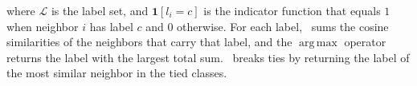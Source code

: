 where $\mathcal{L}$ is the label set, and $\mathbf{1}[l_i = c]$ is the indicator function that equals $1$ when neighbor $i$ has label $c$ and $0$ otherwise. For each label, \votag\ sums the cosine similarities of the neighbors that carry that label, and the $\operatorname*{arg\,max}$ operator returns the label with the largest total sum. \votag\ breaks ties by returning the label of the most similar neighbor in the tied classes.

